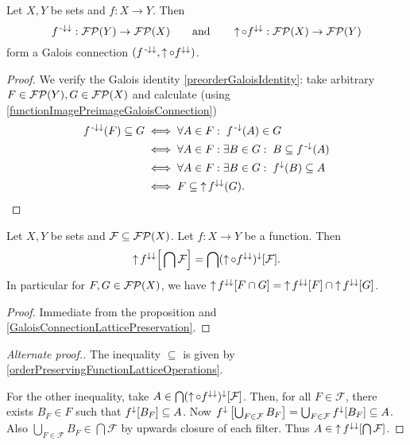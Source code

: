 \begin{proposition} \label{filterPreimageImageGaloisConnection}
Let $X, Y$ be sets and $f: X\to Y$. Then
\[ f^{{\text{\hspace{0.15em}-}\downarrow}\downarrow}: \operatorname{\mathcal{FP}}(Y) \to \operatorname{\mathcal{FP}}(X) \qquad\text{and}\qquad \operatorname{\uparrow}\circ f^{\downarrow\downarrow}: \operatorname{\mathcal{FP}}(X) \to \operatorname{\mathcal{FP}}(Y) \]
form a Galois connection $(f^{{\text{\hspace{0.15em}-}\downarrow}\downarrow}, \operatorname{\uparrow}\circ f^{\downarrow\downarrow})$.
\end{proposition}
\begin{proof}
We verify the Galois identity \ref{preorderGaloisIdentity}: take arbitrary $F\in \operatorname{\mathcal{FP}}(Y), G\in \operatorname{\mathcal{FP}}(X)$ and calculate (using \ref{functionImagePreimageGaloisConnection})
\begin{align*}
f^{{\text{\hspace{0.15em}-}\downarrow}\downarrow}(F) \subseteq G &\iff \forall A\in F: \; f^{\text{\hspace{0.15em}-}\downarrow}(A) \in G \\
&\iff \forall A\in F: \exists B\in G: \; B \subseteq f^{\text{\hspace{0.15em}-}\downarrow}(A) \\
&\iff \forall A\in F: \exists B\in G: \; f^{\downarrow}(B) \subseteq A \\
&\iff F \subseteq \operatorname{\uparrow} f^{\downarrow\downarrow}(G).
\end{align*}
\end{proof}
\begin{corollary} \label{imageFiltersPreservesIntersection}
Let $X, Y$ be sets and $\mathcal{F}\subseteq\operatorname{\mathcal{FP}}(X)$. Let $f:X\to Y$ be a function. Then
\[ \operatorname{\uparrow} f^{\downarrow\downarrow}\Big[\bigcap \mathcal{F}\Big] = \bigcap (\operatorname{\uparrow}\circ f^{\downarrow\downarrow})^{\downarrow}[\mathcal{F}]. \]
In particular for $F,G\in \operatorname{\mathcal{FP}}(X)$, we have $\operatorname{\uparrow} f^{\downarrow\downarrow}[F\cap G] = \operatorname{\uparrow} f^{\downarrow\downarrow}[F] \cap \operatorname{\uparrow} f^{\downarrow\downarrow}[G]$.
\end{corollary}
\begin{proof}
Immediate from the proposition and \ref{GaloisConnectionLatticePreservation}.
\end{proof}
\begin{proof}[Alternate proof.]
The inequality $\subseteq$ is given by \ref{orderPreservingFunctionLatticeOperations}.

For the other inequality, take $A\in \bigcap (\operatorname{\uparrow}\circ f^{\downarrow\downarrow})^{\downarrow}[\mathcal{F}]$. Then, for all $F\in\mathcal{F}$, there exists $B_F\in F$ such that $f^{\downarrow}[B_F] \subseteq A$. Now $f^{\downarrow}\left[\bigcup_{F\in\mathcal{F}}B_F\right] = \bigcup_{F\in\mathcal{F}}f^{\downarrow}[B_F] \subseteq A$. Also $\bigcup_{F\in\mathcal{F}}B_F \in \bigcap \mathcal{F}$ by upwards closure of each filter. Thus $A\in \operatorname{\uparrow} f^{\downarrow\downarrow}[\bigcap \mathcal{F}]$.
\end{proof}



